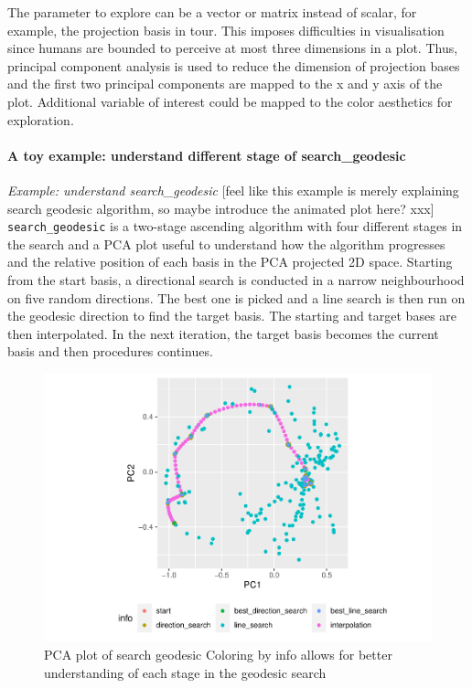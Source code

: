 \documentclass[12pt]{article}
\begin{document}
The parameter to explore can be a vector or matrix instead of scalar,
for example, the projection basis in tour. This imposes difficulties in
visualisation since humans are bounded to perceive at most three
dimensions in a plot. Thus, principal component analysis is used to
reduce the dimension of projection bases and the first two principal
components are mapped to the x and y axis of the plot. Additional
variable of interest could be mapped to the color aesthetics for
exploration.

\hypertarget{a-toy-example-understand-different-stage-of-search_geodesic}{%
\paragraph{A toy example: understand different stage of
search\_geodesic}\label{a-toy-example-understand-different-stage-of-search_geodesic}}

\emph{Example: understand search\_geodesic} {[}feel like this example is
merely explaining search geodesic algorithm, so maybe introduce the
animated plot here? xxx{]} \texttt{search\_geodesic} is a two-stage
ascending algorithm with four different stages in the search and a PCA
plot useful to understand how the algorithm progresses and the relative
position of each basis in the PCA projected 2D space. Starting from the
start basis, a directional search is conducted in a narrow neighbourhood
on five random directions. The best one is picked and a line search is
then run on the geodesic direction to find the target basis. The
starting and target bases are then interpolated. In the next iteration,
the target basis becomes the current basis and then procedures
continues.

\begin{figure}
\centering
\includegraphics{paper_files/figure-latex/pca-1.pdf}
\caption{\label{pca}PCA plot of search geodesic Coloring by info allows
for better understanding of each stage in the geodesic search}
\end{figure}
\end{document}
